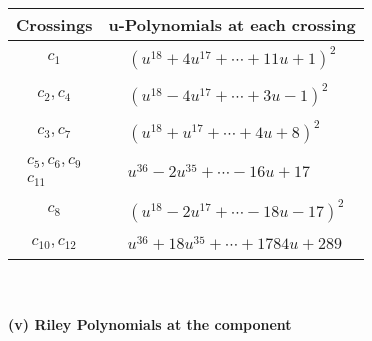 \documentclass[1p]{elsarticle_modified}
\theoremstyle{definition}
\begin{document}
\begin{tabular}{m{50pt}|m{274pt}}
Crossings & \hspace{64pt}u-Polynomials at each crossing \\
\hline $$\begin{aligned}c_{1}\end{aligned}$$&$\begin{aligned}
&(u^{18}+4 u^{17}+\cdots+11 u+1)^{2}
\end{aligned}$\\
\hline $$\begin{aligned}c_{2},c_{4}\end{aligned}$$&$\begin{aligned}
&(u^{18}-4 u^{17}+\cdots+3 u-1)^{2}
\end{aligned}$\\
\hline $$\begin{aligned}c_{3},c_{7}\end{aligned}$$&$\begin{aligned}
&(u^{18}+u^{17}+\cdots+4 u+8)^{2}
\end{aligned}$\\
\hline $$\begin{aligned}c_{5},c_{6},c_{9}\\c_{11}\end{aligned}$$&$\begin{aligned}
&u^{36}-2 u^{35}+\cdots-16 u+17
\end{aligned}$\\
\hline $$\begin{aligned}c_{8}\end{aligned}$$&$\begin{aligned}
&(u^{18}-2 u^{17}+\cdots-18 u-17)^{2}
\end{aligned}$\\
\hline $$\begin{aligned}c_{10},c_{12}\end{aligned}$$&$\begin{aligned}
&u^{36}+18 u^{35}+\cdots+1784 u+289
\end{aligned}$\\
\hline
\end{tabular}\\~\\
\newpage\renewcommand{\arraystretch}{1}
\flushleft \textbf{(v) Riley Polynomials at the component}\newline \\
\end{document}

